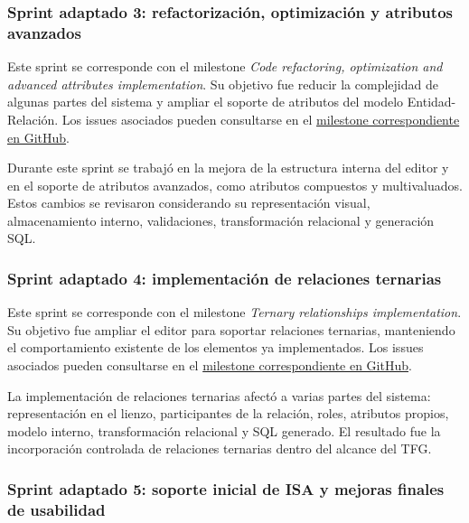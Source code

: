
\subsubsection{Sprint adaptado 3: refactorización, optimización y atributos avanzados}

Este sprint se corresponde con el milestone \textit{Code refactoring, optimization and advanced attributes implementation}. Su objetivo fue reducir la complejidad de algunas partes del sistema y ampliar el soporte de atributos del modelo Entidad-Relación. Los issues asociados pueden consultarse en el \href{https://github.com/saa1002/draw-entity-relation/milestone/3?closed=1}{milestone correspondiente en GitHub}.

Durante este sprint se trabajó en la mejora de la estructura interna del editor y en el soporte de atributos avanzados, como atributos compuestos y multivaluados. Estos cambios se revisaron considerando su representación visual, almacenamiento interno, validaciones, transformación relacional y generación SQL.


\subsubsection{Sprint adaptado 4: implementación de relaciones ternarias}

Este sprint se corresponde con el milestone \textit{Ternary relationships implementation}. Su objetivo fue ampliar el editor para soportar relaciones ternarias, manteniendo el comportamiento existente de los elementos ya implementados. Los issues asociados pueden consultarse en el \href{https://github.com/saa1002/draw-entity-relation/milestone/4?closed=1}{milestone correspondiente en GitHub}.

La implementación de relaciones ternarias afectó a varias partes del sistema: representación en el lienzo, participantes de la relación, roles, atributos propios, modelo interno, transformación relacional y SQL generado. El resultado fue la incorporación controlada de relaciones ternarias dentro del alcance del TFG.


\subsubsection{Sprint adaptado 5: soporte inicial de ISA y mejoras finales de usabilidad}

